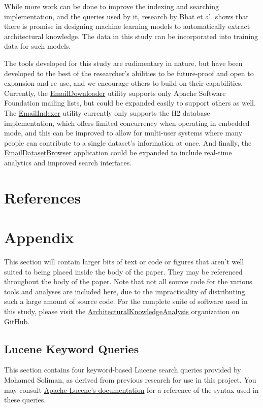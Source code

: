 \documentclass[a4paper, 12pt]{article}
\begin{document}
		While more work can be done to improve the indexing and searching implementation, and the queries used by it, research by Bhat et al.\cite{bhat} shows that there is promise in designing machine learning models to automatically extract architectural knowledge. The data in this study can be incorporated into training data for such models.
		
		The tools developed for this study are rudimentary in nature, but have been developed to the best of the researcher's abilities to be future-proof and open to expansion and re-use, and we encourage others to build on their capabilities. Currently, the \href{https://github.com/ArchitecturalKnowledgeAnalysis/EmailDownloader}{EmailDownloader} utility supports only Apache Software Foundation mailing lists, but could be expanded easily to support others as well. The \href{https://github.com/ArchitecturalKnowledgeAnalysis/EmailIndexer}{EmailIndexer} utility currently only supports the H2 database implementation, which offers limited concurrency when operating in embedded mode, and this can be improved to allow for multi-user systems where many people can contribute to a single dataset's information at once. And finally, the \href{https://github.com/ArchitecturalKnowledgeAnalysis/EmailDatasetBrowser}{EmailDatasetBrowser} application could be expanded to include real-time analytics and improved search interfaces.

\section{References}
	\printbibliography[heading=none]
	\newpage

\section{Appendix}
	This section will contain larger bits of text or code or figures that aren't well suited to being placed inside the body of the paper. They may be referenced throughout the body of the paper. Note that not all source code for the various tools and analyses are included here, due to the impracticality of distributing such a large amount of source code. For the complete suite of software used in this study, please visit the \href{https://github.com/ArchitecturalKnowledgeAnalysis}{ArchitecturalKnowledgeAnalysis} organization on GitHub.
	
	\newpage
	\subsection{Lucene Keyword Queries}
		\label{sec:queries}
		This section contains four keyword-based Lucene search queries provided by Mohamed Soliman, as derived from previous research for use in this project. You may consult \href{https://lucene.apache.org/core/9_2_0/queryparser/org/apache/lucene/queryparser/classic/package-summary.html#package.description}{Apache Lucene's documentation} for a reference of the syntax used in these queries.
		
\end{document}
